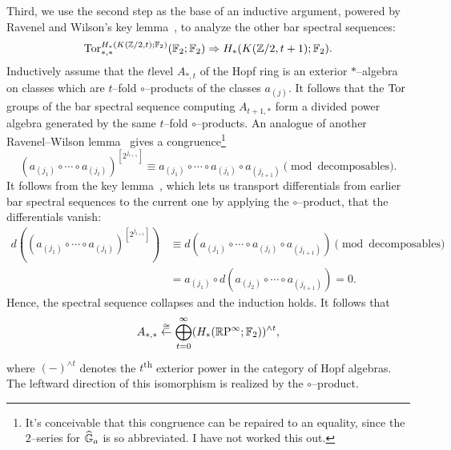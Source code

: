 \begin{example}
Third, we use the second step as the base of an inductive argument, powered by Ravenel and Wilson's key lemma~\cite[Theorem 2.2]{RavenelWilson}, to analyze the other bar spectral sequences: \[\operatorname{Tor}^{H_*(K(\mathbb Z/2, t); \mathbb F_2)}_{*, *}(\mathbb F_2; \mathbb F_2) \Rightarrow H_*(K(\mathbb Z/2, t+1); \mathbb F_2).\]  Inductively assume that the $t$\th level $A_{*, t}$ of the Hopf ring is an exterior $\ast$--algebra on classes which are $t$--fold $\circ$--products of the classes $a_{(j)}$.  It follows that the $\operatorname{Tor}$ groups of the bar spectral sequence computing $A_{t+1, *}$ form a divided power algebra generated by the same $t$--fold $\circ$--products.  An analogue of another Ravenel--Wilson lemma~\cite[Lemma 9.5]{RavenelWilson} gives a congruence\footnote{It's conceivable that this congruence can be repaired to an equality, since the $2$--series for $\widehat{\mathbb G}_a$ is so abbreviated.  I have not worked this out.} \[(a_{(j_1)} \circ \cdots \circ a_{(j_t)})^{[2^{j_{t+1}}]} \equiv a_{(j_1)} \circ \cdots \circ a_{(j_t)} \circ a_{(j_{t+1})} \pmod{\text{decomposables}}.\]  It follows from the key lemma~\cite[Theorem 2.2]{RavenelWilson}, which lets us transport differentials from earlier bar spectral sequences to the current one by applying the $\circ$--product, that the differentials vanish:
\begin{align*}
d((a_{(j_1)} \circ \cdots \circ a_{(j_t)})^{[2^{j_{t+1}}]}) & \equiv d(a_{(j_1)} \circ \cdots \circ a_{(j_t)} \circ a_{(j_{t+1})}) \pmod{\text{decomposables}} \\
& = a_{(j_1)} \circ d(a_{(j_2)} \circ \cdots \circ a_{(j_{t+1})}) = 0.
\end{align*}
Hence, the spectral sequence collapses and the induction holds.  It follows that \[A_{*, *} \stackrel\cong\leftarrow \bigoplus_{t=0}^\infty (H_*(\mathbb R\mathrm P^\infty; \mathbb F_2))^{\wedge t},\] where $(-)^{\wedge t}$ denotes the $t$\textsuperscript{th} exterior power in the category of Hopf algebras.  The leftward direction of this isomorphism is realized by the $\circ$--product.
\end{example}


